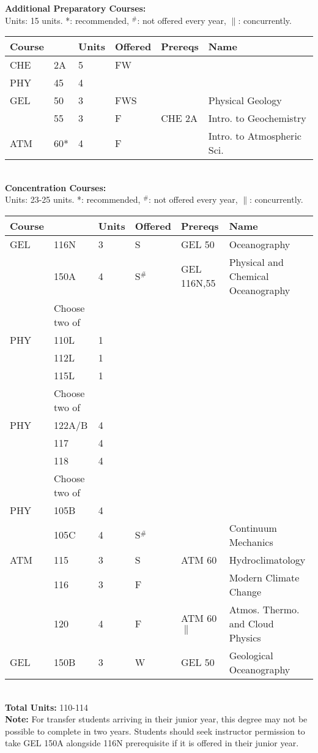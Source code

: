 \documentclass[12pt]{article}
\begin{document}
\newpage
{}
\vskip 0.25cm
\noindent
{\bf Additional Preparatory Courses:  }\\
Units:  15 units. *: recommended, $^\#$: not offered every year, $\parallel$: concurrently.\\
\begin{tabular}{|llllll|}
\hline
Course & & Units & Offered & Prereqs & Name \\
\hline
CHE  & 2A     & 5 & FW  & & \\
PHY  & 45     & 4 &     & & \\
GEL  & 50     & 3 & FWS & & Physical Geology \\
     & 55     & 3 & F      & CHE 2A & Intro. to Geochemistry\\
ATM  & 60*    & 4 & F   & & Intro. to Atmospheric Sci. \\
\hline
\end{tabular}\\
\vskip 0.25cm
\noindent
{\bf Concentration Courses:  }\\
Units:  23-25 units. *: recommended, $^\#$: not offered every year, $\parallel$: concurrently.\\
\begin{tabular}{|llllll|}
\hline
Course & & Units & Offered & Prereqs & Name \\
\hline
GEL  & 116N   & 3 & S      & GEL 50          & Oceanography\\
     & 150A   & 4 & S$^\#$ & GEL 116N,55 & Physical and Chemical Oceanography\\
\hline
    & Choose two of & & & & \\
\hline
PHY  & 110L & 1 & & & \\
     & 112L & 1 & & & \\
     & 115L & 1 & & & \\
\hline
\hline
    & Choose two of & & & & \\
\hline
PHY & 122A/B & 4 & & & \\
    & 117   & 4 & & & \\
    & 118   & 4 & & & \\
\hline
\hline
    & Choose two of & & & & \\
\hline
PHY  & 105B  & 4 & & & \\
     & 105C  & 4 & S$^\#$ & & Continuum Mechanics \\
ATM  & 115   & 3 & S   & ATM 60 & Hydroclimatology \\
     & 116   & 3 & F   & & Modern Climate Change \\
     & 120   & 4 & F   & ATM 60$\parallel$ & Atmos. Thermo. and Cloud Physics \\
GEL  & 150B  & 3 & W & GEL 50 & Geological Oceanography\\
\hline
\end{tabular}\\
\vskip 0.25cm
\noindent
{\bf Total Units:} 110-114\\
{\bf Note: } For transfer students arriving in their junior year, this
degree may not be possible to complete in two years.  Students should
seek instructor permission to take GEL 150A alongside 116N prerequisite if
it is offered in their junior year.\\
\end{document}
